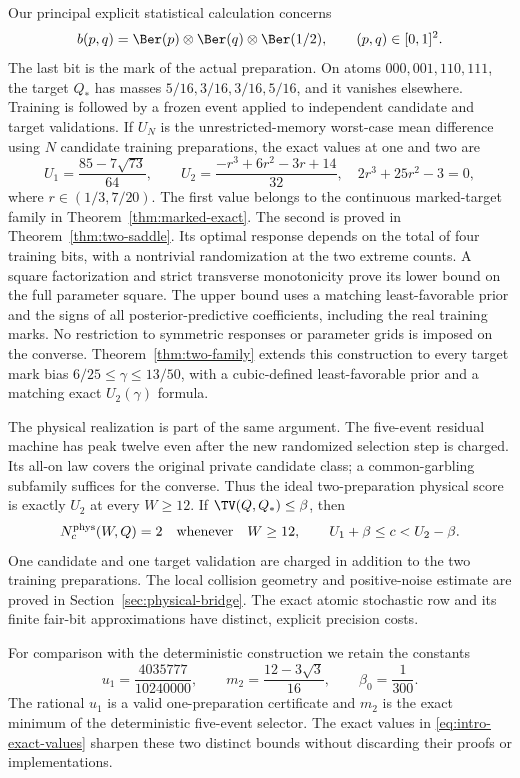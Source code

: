 Our principal explicit statistical calculation concerns
\[
 b(p,q)=\Ber(p)\otimes\Ber(q)\otimes\Ber(1/2),
                        \qquad(p,q)\in[0,1]^2.
\]
The last bit is the mark of the actual preparation. On atoms
$000,001,110,111$, the target $Q_*$ has masses $5/16,3/16,3/16,5/16$,
and it vanishes elsewhere. Training is followed by a frozen event
applied to independent candidate and target validations. If $U_N$
is the unrestricted-memory worst-case mean difference using $N$
candidate training preparations, the exact values at one and two are
\begin{equation}\label{eq:intro-exact-values}
 U_1=\frac{85-7\sqrt{73}}{64},\qquad
 U_2=\frac{-r^3+6r^2-3r+14}{32},\quad 2r^3+25r^2-3=0,
\end{equation}
where $r\in(1/3,7/20)$. The first value belongs to the continuous
marked-target family in Theorem~\ref{thm:marked-exact}. The second is
proved in Theorem~\ref{thm:two-saddle}. Its optimal response depends on
the total of four training bits, with a nontrivial randomization at the
two extreme counts. A square factorization and strict transverse
monotonicity prove its lower bound on the full parameter square. The
upper bound uses a matching least-favorable prior and the signs of all
posterior-predictive coefficients, including the real training marks.
No restriction to symmetric responses or parameter grids is imposed on
the converse. Theorem~\ref{thm:two-family} extends this construction to
every target mark bias $6/25\le\gamma\le13/50$, with a cubic-defined
least-favorable prior and a matching exact $U_2(\gamma)$ formula.

The physical realization is part of the same argument. The five-event
residual machine has peak twelve even after the new randomized selection
step is charged. Its all-on law covers the original private candidate
class; a common-garbling subfamily suffices for the converse. Thus the
ideal two-preparation physical score is exactly $U_2$ at every
$W\ge12$. If $\TV(Q,Q_*)\le\beta$, then
\[
 N_c^{\rm phys}(W,Q)=2\quad\text{whenever}\quad
 W\ge12,\qquad U_1+\beta\le c<U_2-\beta.
\]
One candidate and one target validation are charged in addition to the
two training preparations. The local collision geometry and
positive-noise estimate are proved in Section~\ref{sec:physical-bridge}.
The exact atomic stochastic row and its finite fair-bit approximations
have distinct, explicit precision costs.

For comparison with the deterministic construction we retain the
constants
\begin{equation}\label{eq:constants}
 u_1=\frac{4035777}{10240000},\qquad
 m_2=\frac{12-3\sqrt3}{16},\qquad \beta_0=\frac1{300}.
\end{equation}
The rational $u_1$ is a valid one-preparation certificate and $m_2$ is
the exact minimum of the deterministic five-event selector. The exact
values in \eqref{eq:intro-exact-values} sharpen these two distinct
bounds without discarding their proofs or implementations.

